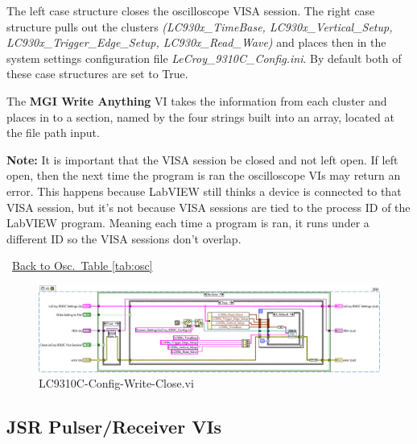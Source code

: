 \documentclass[11pt,a4paper,oldfontcommands]{memoir}
\begin{document}
The left case structure closes the oscilloscope VISA session. The right case structure pulls out the clusters \textit{(LC930x\_TimeBase, LC930x\_Vertical\_Setup, LC930x\_Trigger\_Edge\_Setup, LC930x\_Read\_Wave)} and places then in the system settings configuration file \textit{LeCroy\_9310C\_Config.ini}. By default both of these case structures are set to True.

The \textbf{MGI Write Anything} VI takes the information from each cluster and places in to a section, named by the four strings built into an array, located at the file path input.

\textbf{Note:} It is important that the VISA session be closed and not left open. If left open, then the next time the program is ran the oscilloscope VIs may return an error. This happens because LabVIEW still thinks a device is connected to that VISA session, but it's not because VISA sessions are tied to the process ID of the LabVIEW program. Meaning each time a program is ran, it runs under a different ID so the VISA sessions don't overlap. 

\noindent\hrulefill\, \hyperref[tab:osc]{Back to Osc.\ Table \ref{tab:osc}}

\begin{figure}
	\includegraphics[width=\textheight,keepaspectratio]{LC931C-Config-Write-Close_blockdiagram_01}
	\caption{LC9310C-Config-Write-Close.vi}
	\label{fig:LC9310C-Config-Write-Close_blkdig}
\end{figure}

\newpage

\subsection{JSR Pulser/Receiver VIs}
\end{document}
